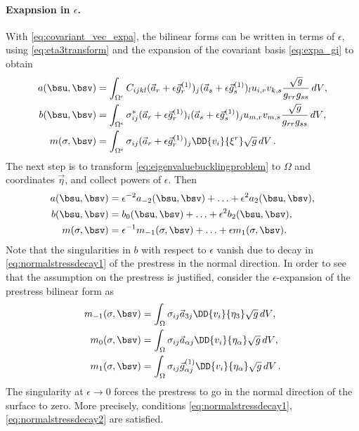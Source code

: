 \paragraph{Exapnsion in $\epsilon$.} With \eqref{eq:covariant_vec_expa}, the bilinear forms can be written in terms of $\epsilon$, using \eqref{eq:eta3transform} and the expansion of the covariant basis \eqref{eq:expa_gi} to obtain
 \begin{align*}
     a(\bsu,\bsv) &= \int_{\Omega^\epsilon} C_{ijkl} ( \vec a_{r} + \epsilon \vec g^{(1)}_r )_j ( \vec a_{s} + \epsilon \vec g^{(1)}_s )_l  u_{i,r} v_{k,s} \frac{\sqrt g}{g_{rr} g_{ss}} \mathop{dV}, \\ 
     b(\bsu,\bsv) &= \int_{\Omega^\epsilon} \sigma^*_{ij} ( \vec a_{r} + \epsilon \vec g^{(1)}_r )_i ( \vec a_{s} + \epsilon \vec g^{(1)}_s )_j  u_{m,r} v_{m,s} \frac{\sqrt g}{g_{rr} g_{ss}} \mathop{dV},\\
     m(\sigma,\bsv) &= \int_{\Omega^\epsilon} \sigma_{ij} (\vec a_r + \epsilon \vec g_{r}^{(1)}) _j  \DD{v_i}{\xi^r} \sqrt{g} \mathop{dV}.
 \end{align*} 
  The next step is to transform \eqref{eq:eigenvaluebucklingproblem} to $\Omega$ and coordinates $\vec \eta$, and collect powers of $\epsilon$. 
  Then
  \begin{align*}
      a(\bsu,\bsv)  & = \epsilon^{-2} a_{-2}(\bsu,\bsv)  + \ldots + \epsilon^{2} a_{2}(\bsu,\bsv), \\ 
      b(\bsu,\bsv)  & =  b_{0}(\bsu,\bsv)  + \ldots + \epsilon^{2} b_{2}(\bsu,\bsv), \\ 
      m(\sigma,\bsv) &=\epsilon^{-1} m_{-1}(\sigma,\bsv)  + \ldots + \epsilon m_{1}(\sigma,\bsv) .
  \end{align*} 
    Note that the singularities in $b$ with respect to $\epsilon$ vanish due to decay in \eqref{eq:normalstressdecay1} of the  prestress in the normal direction. In order to see that the assumption on the prestress is justified, consider the $\epsilon$-expansion of the prestress bilinear form as  \begin{align*}
      m_{-1}(\sigma,\bsv) &=  \int_{\Omega} \sigma_{ij} \vec a_{3j} \DD{v_i}{\eta_3} \sqrt g \mathop{dV}, \\
     m_{0}(\sigma,\bsv) &=  \int_{\Omega} \sigma_{ij} \vec a_{\alpha j} \DD{v_i}{\eta_\alpha} \sqrt g \mathop{dV}, \\ 
      m_{1}(\sigma,\bsv) &=  \int_{\Omega} \sigma_{ij} \vec g_{\alpha j}^{(1)} \DD{v_i}{\eta_\alpha} \sqrt g \mathop{dV}.
  \end{align*}
  The singularity at $\epsilon \to 0$ forces the prestress to go in the normal direction of the surface to zero.
  More precisely, conditions \eqref{eq:normalstressdecay1}, \eqref{eq:normalstressdecay2} are satisfied.

